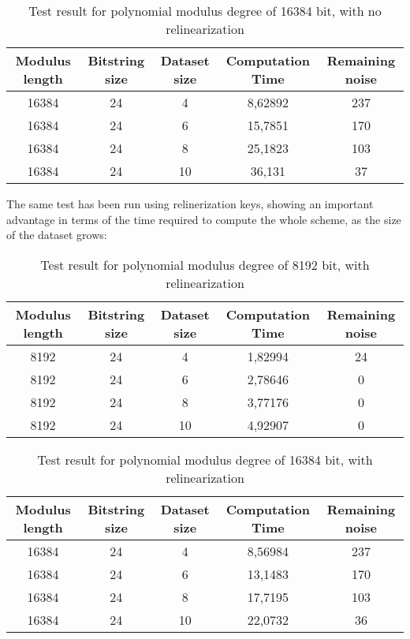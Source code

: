 \documentclass[10pt]{extarticle}
\begin{document}
\begin{table}[!hb]
	\begin{tabular}{||c|c|c|c|c||}
		\hline
		Modulus length & Bitstring size	& Dataset size	& Computation Time	& Remaining noise\\
		\hline\hline
		16384 & 24 & 4 & 8,62892 & 237\\
		\hline
		16384 & 24 & 6 & 15,7851 & 170\\
		\hline
		16384 & 24 & 8 & 25,1823 & 103\\
		\hline
		16384 & 24 & 10 & 36,131 & 37\\
		\hline
	\end{tabular}
	\caption{Test result for polynomial modulus degree of 16384 bit, with no relinearization}
\end{table}
The same test has been run using relinerization keys, showing an important advantage in terms of the time required to compute the whole scheme, as the size of the dataset grows:\\
\begin{table}[!ht]
    \begin{tabular}{||c|c|c|c|c||}
    	\hline
        Modulus length & Bitstring size	& Dataset size	& Computation Time	& Remaining noise\\
        \hline\hline
        8192 & 24 & 4 & 1,82994 & 24\\
        \hline
        8192 & 24 & 6 & 2,78646 & 0\\
        \hline
        8192 & 24 & 8 & 3,77176 & 0\\
        \hline
        8192 & 24 & 10 & 4,92907 & 0\\
        \hline
    \end{tabular}
	\caption{Test result for polynomial modulus degree of 8192 bit, with relinearization}
\end{table}

\begin{table}[!ht]
	\begin{tabular}{||c|c|c|c|c||}
		\hline
		Modulus length & Bitstring size	& Dataset size	& Computation Time	& Remaining noise\\
		\hline\hline
		16384 & 24 & 4 & 8,56984 & 237\\
		\hline
		16384 & 24 & 6 & 13,1483 & 170\\
		\hline
		16384 & 24 & 8 & 17,7195 & 103\\
		\hline
		16384 & 24 & 10 & 22,0732 & 36\\
		\hline
	\end{tabular}
\caption{Test result for polynomial modulus degree of 16384 bit, with relinearization}
\end{table}
\end{document}
